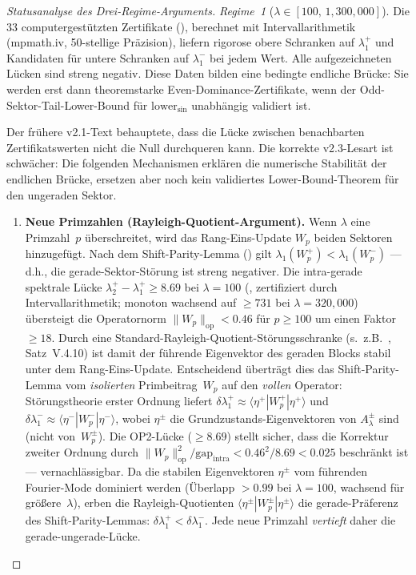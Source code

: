 ﻿\documentclass[12pt,a4paper]{article}
\theoremstyle{definition}
\theoremstyle{remark}
\begin{document}
\begin{proof}[Statusanalyse des Drei-Regime-Arguments]
\emph{Regime~1} ($\lambda \in [100,\, 1{,}300{,}000]$). Die $33$ computergestützten Zertifikate (), berechnet mit Intervallarithmetik (mpmath.iv, 50-stellige Präzision), liefern rigorose obere Schranken auf $\lambda_1^+$ und Kandidaten für untere Schranken auf $\lambda_1^-$ bei jedem Wert. Alle aufgezeichneten Lücken sind streng negativ. Diese Daten bilden eine bedingte endliche Brücke: Sie werden erst dann theoremstarke Even-Dominance-Zertifikate, wenn der Odd-Sektor-Tail-Lower-Bound für $\mathrm{lower}_{\sin}$ unabhängig validiert ist.

Der frühere v2.1-Text behauptete, dass die Lücke zwischen benachbarten Zertifikatswerten nicht die Null durchqueren kann. Die korrekte v2.3-Lesart ist schwächer: Die folgenden Mechanismen erklären die numerische Stabilität der endlichen Brücke, ersetzen aber noch kein validiertes Lower-Bound-Theorem für den ungeraden Sektor.

\begin{enumerate}[label=(\roman*)]
  \item \textbf{Neue Primzahlen (Rayleigh-Quotient-Argument).}
    Wenn $\lambda$ eine Primzahl~$p$ überschreitet, wird das Rang-Eins-Update $W_p$ beiden Sektoren hinzugefügt.
    Nach dem Shift-Parity-Lemma () gilt $\lambda_1(W_p^+) < \lambda_1(W_p^-)$ --- d.h., die gerade-Sektor-Störung ist streng negativer.
    Die intra-gerade spektrale Lücke $\lambda_2^+ - \lambda_1^+ \geq 8.69$ bei $\lambda = 100$ (, zertifiziert durch Intervallarithmetik; monoton wachsend auf $\geq 731$ bei $\lambda = 320{,}000$) übersteigt die Operatornorm $\|W_p\|_{\mathrm{op}} < 0.46$ für $p \geq 100$ um einen Faktor $\geq 18$.
    Durch eine Standard-Rayleigh-Quotient-Störungsschranke (s.\ z.B.\ \cite{Kato1995}, Satz~V.4.10) ist damit der führende Eigenvektor des geraden Blocks stabil unter dem Rang-Eins-Update.
    Entscheidend überträgt dies das Shift-Parity-Lemma vom \emph{isolierten} Primbeitrag~$W_p$ auf den \emph{vollen} Operator: Störungstheorie erster Ordnung liefert $\delta\lambda_1^+ \approx \langle \eta^+ | W_p^+ | \eta^+ \rangle$ und $\delta\lambda_1^- \approx \langle \eta^- | W_p^- | \eta^- \rangle$, wobei $\eta^\pm$ die Grundzustands-Eigenvektoren von $A_\lambda^\pm$ sind (nicht von~$W_p^\pm$).
    Die OP2-Lücke ($\geq 8.69$) stellt sicher, dass die Korrektur zweiter Ordnung durch $\|W_p\|_{\mathrm{op}}^2 / \mathrm{gap}_{\mathrm{intra}} < 0.46^2/8.69 < 0.025$ beschränkt ist --- vernachlässigbar.
    Da die stabilen Eigenvektoren $\eta^\pm$ vom führenden Fourier-Mode dominiert werden (Überlapp $> 0.99$ bei $\lambda = 100$, wachsend für größere~$\lambda$), erben die Rayleigh-Quotienten $\langle \eta^\pm | W_p^\pm | \eta^\pm \rangle$ die gerade-Präferenz des Shift-Parity-Lemmas: $\delta\lambda_1^+ < \delta\lambda_1^-$.
    Jede neue Primzahl \emph{vertieft} daher die gerade-ungerade-Lücke.


\end{enumerate}
\end{proof}
\end{document}
